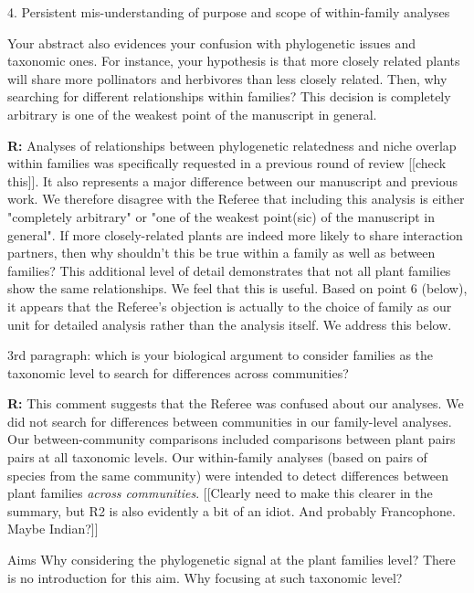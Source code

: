 \documentclass[12pt]{letter}
\newenvironment{refquote}{\bigskip \begin{it}}{\end{it}\smallskip}
\begin{document}
	4. Persistent mis-understanding of purpose and scope of within-family analyses

		\begin{refquote}
		Your abstract also evidences your confusion with phylogenetic issues and taxonomic ones. For instance, your hypothesis is that more closely related plants will share more pollinators and herbivores than less closely related. Then, why searching for different relationships within families? This decision is completely arbitrary is one of the weakest point of the manuscript in general.
		\end{refquote}


		\textbf{R:} Analyses of relationships between phylogenetic relatedness and niche overlap within families was specifically requested in a previous round of review [[check this]]. It also represents a major difference between our manuscript and previous work. We therefore disagree with the Referee that including this analysis is either "completely arbitrary" or "one of the weakest point(sic) of the manuscript in general". If more closely-related plants are indeed more likely to share interaction partners, then why shouldn't this be true within a family as well as between families? This additional level of detail demonstrates that not all plant families show the same relationships. We feel that this is useful. Based on point 6 (below), it appears that the Referee's objection is actually to the choice of family as our unit for detailed analysis rather than the analysis itself. We address this below.


		\begin{refquote}
		3rd paragraph:  which is your biological argument to consider families as the taxonomic level to search for differences across communities?
		\end{refquote}

		\textbf{R:} This comment suggests that the Referee was confused about our analyses. We did not search for differences between communities in our family-level analyses. Our between-community comparisons included comparisons between plant pairs pairs at all taxonomic levels. Our within-family analyses (based on pairs of species from the same community) were intended to detect differences between plant families \emph{across communities}. [[Clearly need to make this clearer in the summary, but R2 is also evidently a bit of an idiot. And probably Francophone. Maybe Indian?]]

		\begin{refquote}
		Aims
		Why considering the phylogenetic signal at the plant families level? There is no introduction for this aim. Why focusing at such taxonomic level?
		\end{refquote}
\end{document}
